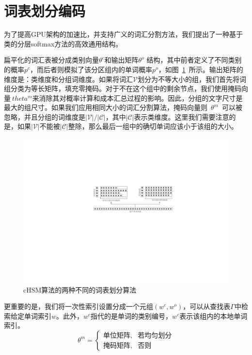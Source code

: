 \section{词表划分编码}
为了提高GPU架构的加速比，并支持广义的词汇分割方法，我们提出了一种基于类的分层softmax方法的高效通用结构。

扁平化的词汇表被分成类别向量$ \theta^c $和输出矩阵$ \theta^o $ 结构，其中前者定义了不同类别的概率$ p ^ c $，而后者则模拟了该分区组内的单词概率$ p ^ o $，如图~\ref {fig:chsm}~所示。输出矩阵的维度是：类维度和分组词维度。如果将词汇$ \mathcal {V} $划分为不等大小的组，我们首先将词组分类为等长矩阵，填充零掩码。对于不在这个组中的剩余节点，我们使用掩码向量$ \ theta ^ m $来消除其对概率计算和成本汇总过程的影响。因此，分组的文字尺寸是最大的组尺寸。如果我们应用相同大小的词汇分割算法，掩码向量则~$\theta^m$~可以被忽略，并且分组的词维度是$ \mathcal {| V | / | C |} $，其中$ \mathcal {| C |} $表示类维度。这里我们需要注意的是，如果$ \mathcal {| V |} $不能被$ \mathcal {| C |} $整除，那么最后一组中的确切单词应该小于该组的大小。
\begin{figure}[!ht]
  \centering
\includegraphics[width=0.85\linewidth]{./figures/chsm-simple.pdf}
\caption{cHSM算法的两种不同的词表划分算法}\label{fig:chsm}
\end{figure}


更重要的是，我们将一次性索引设置分成一个元组$(w ^ c,w ^ o)$，可以从查找表$\Gamma $中检索给定单词索引$ w $。此外，$ w ^ c $指代的是单词的类别编号，$ w^c $表示该组内的本地单词索引。
\begin{equation}\label{equ:partition}
 \theta^m=
\begin{cases}
    \text{单位矩阵} ,& \text{若均匀划分} \\
    \text{掩码矩阵},   & \text{否则}
\end{cases}
\end{equation}


